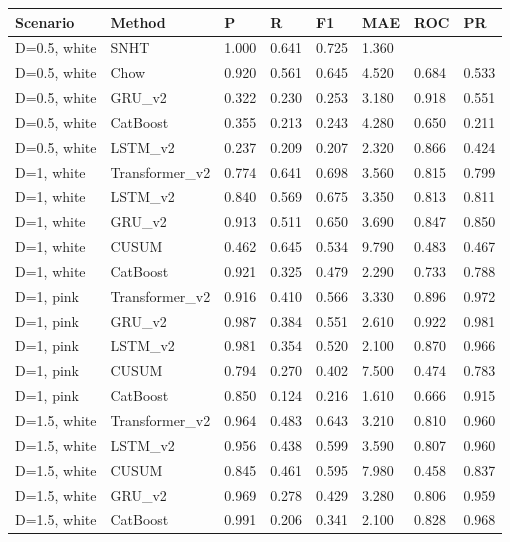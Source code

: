 \begin{tabular}{llllllll}
\toprule
Scenario & Method & P & R & F1 & MAE & ROC & PR \\
\midrule
D=0.5, white & SNHT & 1.000 & 0.641 & 0.725 & 1.360 &  &  \\
D=0.5, white & Chow & 0.920 & 0.561 & 0.645 & 4.520 & 0.684 & 0.533 \\
D=0.5, white & GRU\_v2 & 0.322 & 0.230 & 0.253 & 3.180 & 0.918 & 0.551 \\
D=0.5, white & CatBoost & 0.355 & 0.213 & 0.243 & 4.280 & 0.650 & 0.211 \\
D=0.5, white & LSTM\_v2 & 0.237 & 0.209 & 0.207 & 2.320 & 0.866 & 0.424 \\
D=1, white & Transformer\_v2 & 0.774 & 0.641 & 0.698 & 3.560 & 0.815 & 0.799 \\
D=1, white & LSTM\_v2 & 0.840 & 0.569 & 0.675 & 3.350 & 0.813 & 0.811 \\
D=1, white & GRU\_v2 & 0.913 & 0.511 & 0.650 & 3.690 & 0.847 & 0.850 \\
D=1, white & CUSUM & 0.462 & 0.645 & 0.534 & 9.790 & 0.483 & 0.467 \\
D=1, white & CatBoost & 0.921 & 0.325 & 0.479 & 2.290 & 0.733 & 0.788 \\
D=1, pink & Transformer\_v2 & 0.916 & 0.410 & 0.566 & 3.330 & 0.896 & 0.972 \\
D=1, pink & GRU\_v2 & 0.987 & 0.384 & 0.551 & 2.610 & 0.922 & 0.981 \\
D=1, pink & LSTM\_v2 & 0.981 & 0.354 & 0.520 & 2.100 & 0.870 & 0.966 \\
D=1, pink & CUSUM & 0.794 & 0.270 & 0.402 & 7.500 & 0.474 & 0.783 \\
D=1, pink & CatBoost & 0.850 & 0.124 & 0.216 & 1.610 & 0.666 & 0.915 \\
D=1.5, white & Transformer\_v2 & 0.964 & 0.483 & 0.643 & 3.210 & 0.810 & 0.960 \\
D=1.5, white & LSTM\_v2 & 0.956 & 0.438 & 0.599 & 3.590 & 0.807 & 0.960 \\
D=1.5, white & CUSUM & 0.845 & 0.461 & 0.595 & 7.980 & 0.458 & 0.837 \\
D=1.5, white & GRU\_v2 & 0.969 & 0.278 & 0.429 & 3.280 & 0.806 & 0.959 \\
D=1.5, white & CatBoost & 0.991 & 0.206 & 0.341 & 2.100 & 0.828 & 0.968 \\
\bottomrule
\end{tabular}
